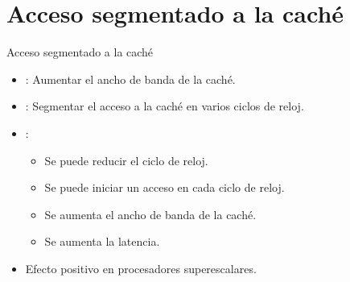 \section{Acceso segmentado a la caché}

\begin{frame}[t]{Acceso segmentado a la caché}
\begin{itemize}
  \item {}: Aumentar el ancho de banda de la caché.

  \item {}: Segmentar el acceso a la caché en varios ciclos de reloj.

  \item {}:
    \begin{itemize}
      \item Se puede reducir el ciclo de reloj.
      \item Se puede iniciar un acceso en cada ciclo de reloj.
      \item Se aumenta el ancho de banda de la caché.
      \item Se aumenta la latencia.
    \end{itemize}

  \item Efecto positivo en procesadores superescalares.
\end{itemize}
\end{frame}
